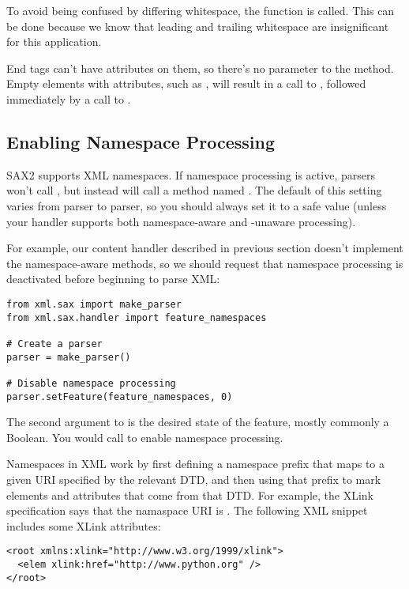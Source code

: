 \documentclass{howto}
\begin{document}
To avoid being confused by differing whitespace, the
 function is called.  This can be
done because we know that leading and trailing whitespace are
insignificant for this application.  

End tags can't have attributes on them, so there's no 
parameter to the  method.  Empty elements with
attributes, such as , will result
in a call to , followed immediately by a call
to .

\subsection{Enabling Namespace Processing}

SAX2 supports XML namespaces.  If namespace processing is active,
parsers won't call , but instead will call a
method named . The default of this
setting varies from parser to parser, so you should always set it to a
safe value (unless your handler supports both namespace-aware and
-unaware processing).

For example, our  content handler described in
previous section doesn't implement the namespace-aware methods, so we
should request that namespace processing is deactivated before
beginning to parse XML:

\begin{verbatim}
from xml.sax import make_parser
from xml.sax.handler import feature_namespaces

# Create a parser
parser = make_parser()

# Disable namespace processing
parser.setFeature(feature_namespaces, 0)
\end{verbatim}

The second argument to  is the desired state of
the feature, mostly commonly a Boolean.  You would call
 to enable namespace
processing.

Namespaces in XML work by first defining a namespace prefix that maps
to a given URI specified by the relevant DTD, and then using that
prefix to mark elements and attributes that come from that DTD.  For
example, the XLink specification says that the namaspace URI is 
.  The following XML snippet
includes some XLink attributes:

\begin{verbatim}
<root xmlns:xlink="http://www.w3.org/1999/xlink">
  <elem xlink:href="http://www.python.org" />
</root>
\end{verbatim}
\end{document}
